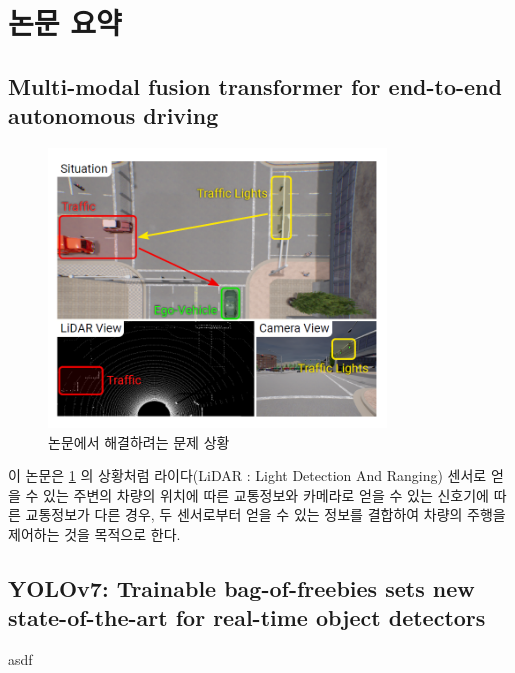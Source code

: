\section{논문 요약}{\label{sec:review}}

\subsection{Multi-modal fusion transformer for end-to-end autonomous driving}{\label{subsec:Transfuser}}
\begin{figure}[htp]
    \centering
    \includegraphics[width=0.8\textwidth]{figures/Transfuser.png}
    \caption{논문에서 해결하려는 문제 상황}
    \label{fig:tfprob}
\end{figure}
이 논문은 \ref{fig:tfprob} 의 상황처럼
라이다(LiDAR : Light Detection And Ranging) 센서로 얻을 수 있는 주변의 차량의 위치에 따른 교통정보와
카메라로 얻을 수 있는 신호기에 따른 교통정보가 다른 경우,
두 센서로부터 얻을 수 있는 정보를 결합하여 차량의 주행을 제어하는 것을 목적으로 한다.


\subsection{YOLOv7: Trainable bag-of-freebies sets new state-of-the-art for real-time object detectors}{\label{subsec:yolov7}}

asdf